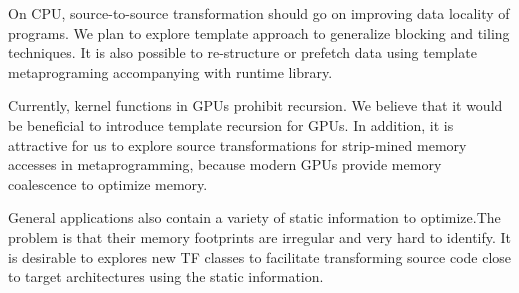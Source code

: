On CPU, source-to-source transformation should go on improving data
locality of programs. We plan to explore template approach to  generalize
blocking and tiling techniques.  It is also possible to re-structure
or prefetch data using template metaprograming accompanying with
runtime library.

Currently, kernel functions in GPUs prohibit recursion. We believe that
it would be beneficial to introduce template recursion for
GPUs. In addition, it is attractive for us to explore source transformations for
strip-mined memory accesses in metaprogramming, because modern GPUs
provide memory coalescence to optimize memory.


General applications also contain a variety of static information to
optimize.The problem is that their memory footprints are irregular and
very hard to identify. It is desirable to explores new TF classes to facilitate
transforming source code close to target architectures using the static
information.
